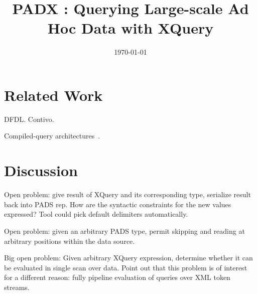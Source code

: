 \documentclass[preprint]{sigplanconf}
\title{PADX : Querying Large-scale Ad Hoc Data with XQuery}
\date{\today}
\begin{document}
\maketitle
\begin{abstract}
\end{abstract}







\section{Related Work}
\label{section:relatedwork}

DFDL. Contivo.  

Compiled-query architectures~\cite{daytona}. 

\section{Discussion}
\label{section:future}
Open problem: give result of XQuery and its corresponding type,
serialize result back into PADS rep.  How are the syntactic
constraints for the new values expressed?  Tool could pick default
delimiters automatically. 

Open problem: given an arbitrary PADS type, permit skipping and
reading at arbitrary positions within the data source. 

Big open problem: Given arbitrary XQuery expression, determine whether
it can be evaluated in single scan over data.  Point out that this
problem is of interest for a different reason: fully pipeline
evaluation of queries over XML token streams.


\small
 
\end{document}
